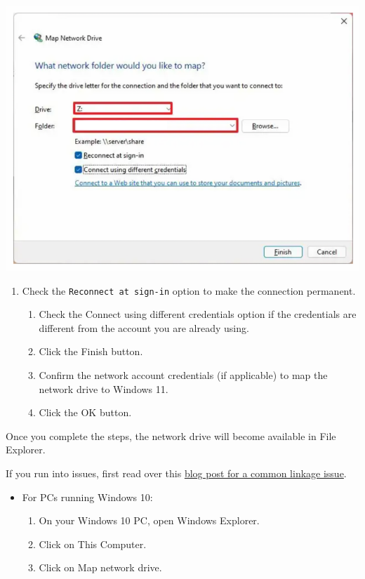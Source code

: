 \documentclass[
]{book}
\providecommand{\tightlist}{%
  \setlength{\itemsep}{0pt}\setlength{\parskip}{0pt}}
\begin{document}
\begin{flushleft}\includegraphics{images/nas_path} \end{flushleft}

\begin{enumerate}
\def\labelenumi{\arabic{enumi}.}
\setcounter{enumi}{5}
\tightlist
\item
  Check the \texttt{Reconnect\ at\ sign-in} option to make the connection permanent.

  \begin{enumerate}
  \def\labelenumii{\arabic{enumii}.}
  \setcounter{enumii}{6}
  \tightlist
  \item
    Check the Connect using different credentials option if the credentials are different from the account you are already using.
  \item
    Click the Finish button.
  \item
    Confirm the network account credentials (if applicable) to map the network drive to Windows 11.
  \item
    Click the OK button.
  \end{enumerate}
\end{enumerate}

Once you complete the steps, the network drive will become available in File Explorer.

If you run into issues, first read over this \href{https://www.robertwent.com/blog/mapping-a-synology-nas-drive-in-windows-11/}{blog post for a common linkage issue}.

\begin{itemize}
\tightlist
\item
  For PCs running Windows 10:

  \begin{enumerate}
  \def\labelenumi{\arabic{enumi}.}
  \tightlist
  \item
    On your Windows 10 PC, open Windows Explorer.
  \item
    Click on This Computer.
  \item
    Click on Map network drive.
  \end{enumerate}
\end{itemize}
\end{document}
